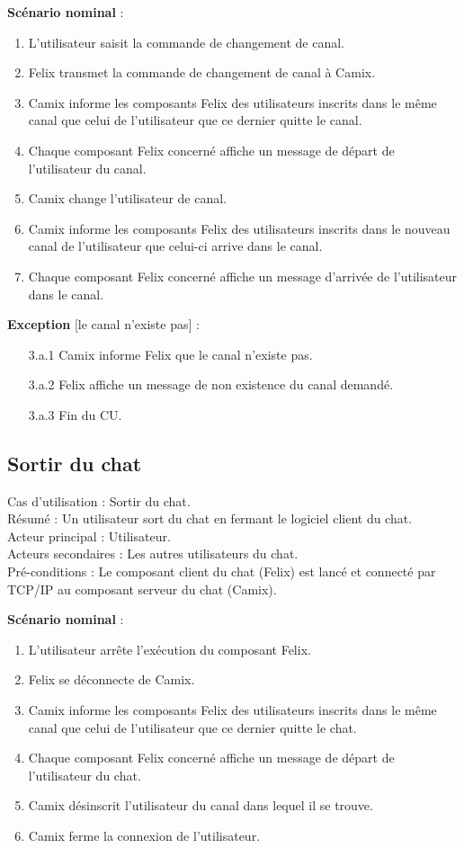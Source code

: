 \newpage
\textbf{Scénario nominal} :
\begin{enumerate}
\item L'utilisateur saisit la commande de changement de canal.
\item Felix transmet la commande de changement de canal à Camix.
\item Camix informe les composants Felix des utilisateurs inscrits dans le même canal que celui de l'utilisateur que ce dernier quitte le canal.
\item Chaque composant Felix concerné affiche un message de départ de l'utilisateur du canal.
\item Camix change l'utilisateur de canal.
\item Camix informe les composants Felix des utilisateurs inscrits dans le nouveau canal de l'utilisateur que celui-ci arrive dans le canal.
\item Chaque composant Felix concerné affiche un message d'arrivée de l'utilisateur dans le canal.
\end{enumerate}

\textbf{Exception} [le canal n'existe pas] :
\begin{enumerate}
\item[3.a.1] Camix informe Felix que le canal n'existe pas.
\item[3.a.2] Felix affiche un message de non existence du canal demandé.
\item[3.a.3] Fin du CU.
\end{enumerate}


\subsection{Sortir du chat}
\label{sec:cu:sortirchat}

\noindent
Cas d'utilisation : Sortir du chat.\\
Résumé : Un utilisateur sort du chat en fermant le logiciel client du chat.\\
Acteur principal : Utilisateur.\\
Acteurs secondaires : Les autres utilisateurs du chat.\\
Pré-conditions : Le composant client du chat (Felix) est lancé et connecté par TCP/IP au composant serveur du chat (Camix).

\medskip
\textbf{Scénario nominal} :
\begin{enumerate}
\item L'utilisateur arrête l'exécution du composant Felix.
\item Felix se déconnecte de Camix.
\item Camix informe les composants Felix des utilisateurs inscrits dans le même canal que celui de l'utilisateur que ce dernier quitte le chat.
\item Chaque composant Felix concerné affiche un message de départ de l'utilisateur du chat.
\item Camix désinscrit l'utilisateur du canal dans lequel il se trouve.
\item Camix ferme la connexion de l'utilisateur.
\end{enumerate}

